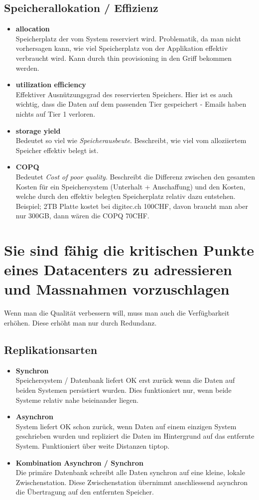 \subsection{Speicherallokation / Effizienz}\label{sec:speichereffizienz}
\begin{itemize}
	\item \textbf{allocation} \\
		Speicherplatz der vom System reserviert wird. Problematik, da man nicht vorhersagen kann, wie viel Speicherplatz von der Applikation effektiv verbraucht wird. Kann durch thin provisioning in den Griff bekommen werden.
	\item \textbf{utilization efficiency} \\
		Effektiver Ausnützungsgrad des reservierten Speichers. Hier ist es auch wichtig, dass die Daten auf dem passenden Tier gespeichert - Emails haben nichts auf Tier 1 verloren. 
	\item \textbf{storage yield} \\
		Bedeutet so viel wie \emph{Speicherausbeute}. Beschreibt, wie viel vom alloziiertem Speicher effektiv belegt ist.
	\item \textbf{COPQ} \\
		Bedeutet \emph{Cost of poor quality}. Beschreibt die Differenz zwischen den gesamten Kosten für ein Speichersystem (Unterhalt + Anschaffung) und den Kosten, welche durch den effektiv belegten Speicherplatz relativ dazu entstehen. Beispiel; 2TB Platte kostet bei digitec.ch 100CHF, davon braucht man aber nur 300GB, dann wären die COPQ 70CHF.
\end{itemize}
\section{Sie sind fähig die kritischen Punkte eines Datacenters zu adressieren und Massnahmen vorzuschlagen}
Wenn man die Qualität verbessern will, muss man auch die Verfügbarkeit erhöhen. Diese erhöht man nur durch Redundanz.
\subsection{Replikationsarten}\label{sec:replikationsarten}
\begin{itemize}
	\item \textbf{Synchron} \\
		Speichersystem / Datenbank liefert OK erst zurück wenn die Daten auf beiden Systemen persistiert wurden. Dies funktioniert nur, wenn beide Systeme relativ nahe beieinander liegen.
	\item \textbf{Asynchron} \\
		System liefert OK schon zurück, wenn Daten auf einem einzigen System geschrieben wurden und repliziert die Daten im Hintergrund auf das entfernte System. Funktioniert über weite Distanzen tiptop.
	\item \textbf{Kombination Asynchron / Synchron} \\
		Die primäre Datenbank schreibt alle Daten synchron auf eine kleine, lokale Zwischenstation. Diese Zwischenstation übernimmt anschliessend asynchron die Übertragung auf den entfernten Speicher.
\end{itemize}
